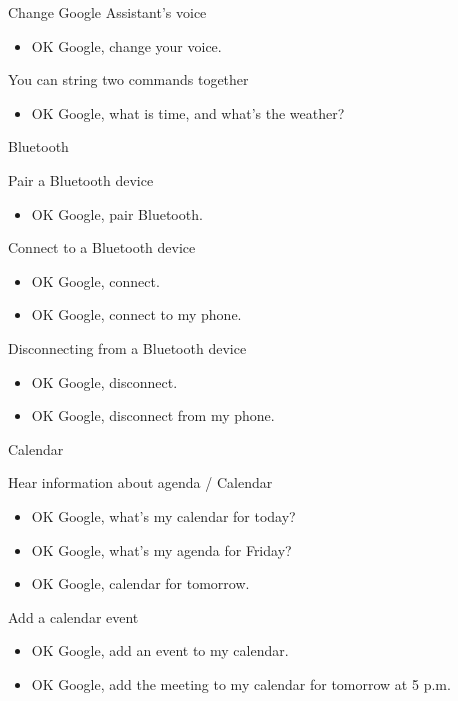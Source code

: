 \documentclass[
  letterpaper,
  DIV=11,
  numbers=noendperiod]{scrartcl}
\providecommand{\tightlist}{%
  \setlength{\itemsep}{0pt}\setlength{\parskip}{0pt}}\usepackage{longtable,booktabs,array}
\begin{document}
Change Google Assistant's voice

\begin{itemize}
\tightlist
\item
  OK Google, change your voice.
\end{itemize}

You can string two commands together

\begin{itemize}
\tightlist
\item
  OK Google, what is time, and what's the weather?
\end{itemize}

Bluetooth

Pair a Bluetooth device

\begin{itemize}
\tightlist
\item
  OK Google, pair Bluetooth.
\end{itemize}

Connect to a Bluetooth device

\begin{itemize}
\tightlist
\item
  OK Google, connect.
\item
  OK Google, connect to my phone.
\end{itemize}

Disconnecting from a Bluetooth device

\begin{itemize}
\tightlist
\item
  OK Google, disconnect.
\item
  OK Google, disconnect from my phone.
\end{itemize}

Calendar

Hear information about agenda / Calendar

\begin{itemize}
\tightlist
\item
  OK Google, what's my calendar for today?
\item
  OK Google, what's my agenda for Friday?
\item
  OK Google, calendar for tomorrow.
\end{itemize}

Add a calendar event

\begin{itemize}
\tightlist
\item
  OK Google, add an event to my calendar.
\item
  OK Google, add the meeting to my calendar for tomorrow at 5 p.m.
\end{itemize}
\end{document}
